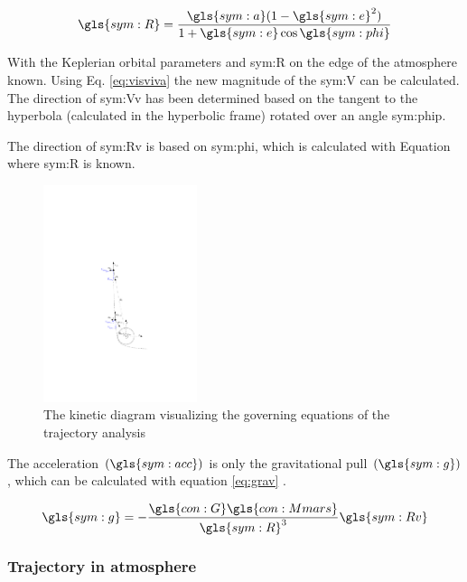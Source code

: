 \begin{equation}
\gls{sym:R} = \frac{\gls{sym:a}(1-\gls{sym:e}^2)}{1+\gls{sym:e}\cos{\gls{sym:phi}}}
\label{eq:polarkep}
\end{equation}

With the Keplerian orbital parameters and \gls{sym:R} on the edge of the atmosphere known. Using Eq. \ref{eq:visviva} the new magnitude of the \gls{sym:V} can be calculated. The direction of \gls{sym:Vv} has been determined based on the tangent to the hyperbola (calculated in the hyperbolic frame) rotated over an angle \gls{sym:phip}.

The direction of \gls{sym:Rv} is based on \gls{sym:phi}, which is calculated with Equation \label{eq:polarkep} where \gls{sym:R} is known.

\begin{figure}
		\centering
		\includegraphics[width = 0.4\textwidth]{Figure/orbital_mechanics.pdf}
		\caption{The kinetic diagram visualizing the governing equations of the trajectory analysis}
		\label{fig:orb}
\end{figure}

The acceleration $\left(\gls{sym:acc}\right)$ is only the gravitational pull $\left(\gls{sym:g}\right)$, which can be calculated with equation \ref{eq:grav} \cite{Weiland2004}.



\begin{equation} \label{eq:grav}
\gls{sym:g} = -\frac{\gls{con:G}\gls{con:Mmars}}
					{\gls{sym:R}^3}\gls{sym:Rv}
\end{equation}

\subsubsection{Trajectory in atmosphere}
 \label{sec:trajatmos}
 


